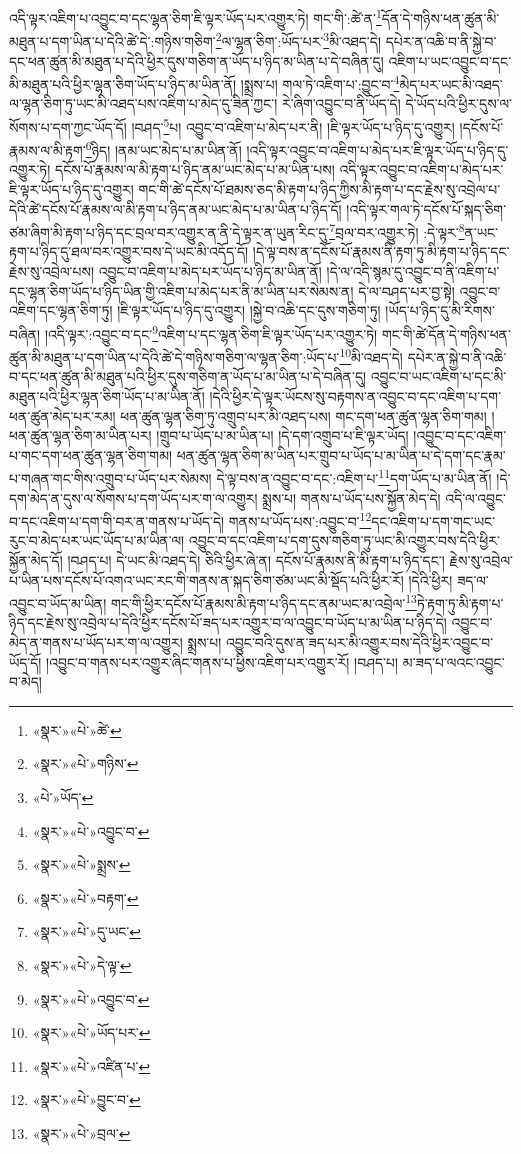 འདི་ལྟར་འཇིག་པ་འབྱུང་བ་དང་ལྷན་ཅིག་ཇི་ལྟར་ཡོད་པར་འགྱུར་ཏེ། གང་གི་:ཚེ་ན་\footnote{«སྣར་»«པེ་»ཚེ་}དོན་དེ་གཉིས་ཕན་ཚུན་མི་མཐུན་པ་དག་ཡིན་པ་དེའི་ཚེ་དེ་:གཉིས་གཅིག་\footnote{«སྣར་»«པེ་»གཉིས་}ལ་ལྷན་ཅིག་:ཡོད་པར་\footnote{«པེ་»ཡོད་}མི་འཐད་དེ། དཔེར་ན་འཆི་བ་ནི་སྐྱེ་བ་དང་ཕན་ཚུན་མི་མཐུན་པ་དེའི་ཕྱིར་དུས་གཅིག་ན་ཡོད་པ་ཉིད་མ་ཡིན་པ་དེ་བཞིན་དུ། འཇིག་པ་ཡང་འབྱུང་བ་དང་མི་མཐུན་པའི་ཕྱིར་ལྷན་ཅིག་ཡོད་པ་ཉིད་མ་ཡིན་ནོ། །སྨྲས་པ། གལ་ཏེ་འཇིག་པ་:བྱུང་བ་\footnote{«སྣར་»«པེ་»འབྱུང་བ་}མེད་པར་ཡང་མི་འཐད་ལ་ལྷན་ཅིག་ཏུ་ཡང་མི་འཐད་པས་འཇིག་པ་མེད་དུ་ཟིན་ཀྱང་། རེ་ཞིག་འབྱུང་བ་ནི་ཡོད་དེ། དེ་ཡོད་པའི་ཕྱིར་དུས་ལ་སོགས་པ་དག་ཀྱང་ཡོད་དོ། །བཤད་\footnote{«སྣར་»«པེ་»སྨྲས་}པ། འབྱུང་བ་འཇིག་པ་མེད་པར་ནི། །ཇི་ལྟར་ཡོད་པ་ཉིད་དུ་འགྱུར། །དངོས་པོ་རྣམས་ལ་མི་རྟག་\footnote{«སྣར་»«པེ་»བརྟག་}ཉིད། །ནམ་ཡང་མེད་པ་མ་ཡིན་ནོ། །འདི་ལྟར་འབྱུང་བ་འཇིག་པ་མེད་པར་ཇི་ལྟར་ཡོད་པ་ཉིད་དུ་འགྱུར་ཏེ། དངོས་པོ་རྣམས་ལ་མི་རྟག་པ་ཉིད་ནམ་ཡང་མེད་པ་མ་ཡིན་པས། འདི་ལྟར་འབྱུང་བ་འཇིག་པ་མེད་པར་ཇི་ལྟར་ཡོད་པ་ཉིད་དུ་འགྱུར། གང་གི་ཚེ་དངོས་པོ་ཐམས་ཅད་མི་རྟག་པ་ཉིད་ཀྱིས་མི་རྟག་པ་དང་རྗེས་སུ་འབྲེལ་པ་དེའི་ཚེ་དངོས་པོ་རྣམས་ལ་མི་རྟག་པ་ཉིད་ནམ་ཡང་མེད་པ་མ་ཡིན་པ་ཉིད་དོ། །འདི་ལྟར་གལ་ཏེ་དངོས་པོ་སྐད་ཅིག་ཙམ་ཞིག་མི་རྟག་པ་ཉིད་དང་བྲལ་བར་འགྱུར་ན་ནི་དེ་ལྟར་ན་ཡུན་རིང་དུ་\footnote{«སྣར་»«པེ་»དུ་ཡང་}བྲལ་བར་འགྱུར་ཏེ། :དེ་ལྟར་\footnote{«སྣར་»«པེ་»དེ་ལྟ་}ན་ཡང་རྟག་པ་ཉིད་དུ་ཐལ་བར་འགྱུར་བས་དེ་ཡང་མི་འདོད་དོ། །དེ་ལྟ་བས་ན་དངོས་པོ་རྣམས་ནི་རྟག་ཏུ་མི་རྟག་པ་ཉིད་དང་རྗེས་སུ་འབྲེལ་པས། འབྱུང་བ་འཇིག་པ་མེད་པར་ཡོད་པ་ཉིད་མ་ཡིན་ནོ། །དེ་ལ་འདི་སྙམ་དུ་འབྱུང་བ་ནི་འཇིག་པ་དང་ལྷན་ཅིག་ཡོད་པ་ཉིད་ཡིན་གྱི་འཇིག་པ་མེད་པར་ནི་མ་ཡིན་པར་སེམས་ན། དེ་ལ་བཤད་པར་བྱ་སྟེ། འབྱུང་བ་འཇིག་དང་ལྷན་ཅིག་ཏུ། །ཇི་ལྟར་ཡོད་པ་ཉིད་དུ་འགྱུར། །སྐྱེ་བ་འཆི་དང་དུས་གཅིག་ཏུ། །ཡོད་པ་ཉིད་དུ་མི་རིགས་བཞིན། །འདི་ལྟར་:འབྱུང་བ་དང་\footnote{«སྣར་»«པེ་»འབྱུང་བ་}འཇིག་པ་དང་ལྷན་ཅིག་ཇི་ལྟར་ཡོད་པར་འགྱུར་ཏེ། གང་གི་ཚེ་དོན་དེ་གཉིས་ཕན་ཚུན་མི་མཐུན་པ་དག་ཡིན་པ་དེའི་ཚེ་དེ་གཉིས་གཅིག་ལ་ལྷན་ཅིག་:ཡོད་པ་\footnote{«སྣར་»«པེ་»ཡོད་པར་}མི་འཐད་དེ། དཔེར་ན་སྐྱེ་བ་ནི་འཆི་བ་དང་ཕན་ཚུན་མི་མཐུན་པའི་ཕྱིར་དུས་གཅིག་ན་ཡོད་པ་མ་ཡིན་པ་དེ་བཞིན་དུ། འབྱུང་བ་ཡང་འཇིག་པ་དང་མི་མཐུན་པའི་ཕྱིར་ལྷན་ཅིག་ཡོད་པ་མ་ཡིན་ནོ། །དེའི་ཕྱིར་དེ་ལྟར་ཡོངས་སུ་བརྟགས་ན་འབྱུང་བ་དང་འཇིག་པ་དག་ཕན་ཚུན་མེད་པར་རམ། ཕན་ཚུན་ལྷན་ཅིག་ཏུ་འགྲུབ་པར་མི་འཐད་པས། གང་དག་ཕན་ཚུན་ལྷན་ཅིག་གམ། །ཕན་ཚུན་ལྷན་ཅིག་མ་ཡིན་པར། །གྲུབ་པ་ཡོད་པ་མ་ཡིན་པ། །དེ་དག་འགྲུབ་པ་ཇི་ལྟར་ཡོད། །འབྱུང་བ་དང་འཇིག་པ་གང་དག་ཕན་ཚུན་ལྷན་ཅིག་གམ། ཕན་ཚུན་ལྷན་ཅིག་མ་ཡིན་པར་གྲུབ་པ་ཡོད་པ་མ་ཡིན་པ་དེ་དག་དང་རྣམ་པ་གཞན་གང་གིས་འགྲུབ་པ་ཡོད་པར་སེམས། དེ་ལྟ་བས་ན་འབྱུང་བ་དང་:འཇིག་པ་\footnote{«སྣར་»«པེ་»འཛིན་པ་}དག་ཡོད་པ་མ་ཡིན་ནོ། །དེ་དག་མེད་ན་དུས་ལ་སོགས་པ་དག་ཡོད་པར་ག་ལ་འགྱུར། སྨྲས་པ། གནས་པ་ཡོད་པས་སྐྱོན་མེད་དེ། འདི་ལ་འབྱུང་བ་དང་འཇིག་པ་དག་གི་བར་ན་གནས་པ་ཡོད་དེ། གནས་པ་ཡོད་པས་:འབྱུང་བ་\footnote{«སྣར་»«པེ་»བྱུང་བ་}དང་འཇིག་པ་དག་གང་ཡང་རུང་བ་མེད་པར་ཡང་ཡོད་པ་མ་ཡིན་ལ། འབྱུང་བ་དང་འཇིག་པ་དག་དུས་གཅིག་ཏུ་ཡང་མི་འགྱུར་བས་དེའི་ཕྱིར་སྐྱོན་མེད་དོ། །བཤད་པ། དེ་ཡང་མི་འཐད་དེ། ཅིའི་ཕྱིར་ཞེ་ན། དངོས་པོ་རྣམས་ནི་མི་རྟག་པ་ཉིད་དང་། རྗེས་སུ་འབྲེལ་པ་ཡིན་པས་དངོས་པོ་འགའ་ཡང་རང་གི་གནས་ན་སྐད་ཅིག་ཙམ་ཡང་མི་སྡོད་པའི་ཕྱིར་རོ། །དེའི་ཕྱིར། ཟད་ལ་འབྱུང་བ་ཡོད་མ་ཡིན། གང་གི་ཕྱིར་དངོས་པོ་རྣམས་མི་རྟག་པ་ཉིད་དང་ནམ་ཡང་མ་འབྲེལ་\footnote{«སྣར་»«པེ་»བྲལ་}ཏེ་རྟག་ཏུ་མི་རྟག་པ་ཉིད་དང་རྗེས་སུ་འབྲེལ་པ་དེའི་ཕྱིར་དངོས་པོ་ཟད་པར་འགྱུར་བ་ལ་འབྱུང་བ་ཡོད་པ་མ་ཡིན་པ་ཉིད་དེ། འབྱུང་བ་མེད་ན་གནས་པ་ཡོད་པར་ག་ལ་འགྱུར། སྨྲས་པ། འབྱུང་བའི་དུས་ན་ཟད་པར་མི་འགྱུར་བས་དེའི་ཕྱིར་འབྱུང་བ་ཡོད་དོ། །འབྱུང་བ་གནས་པར་འགྱུར་ཞིང་གནས་པ་ཕྱིས་འཇིག་པར་འགྱུར་རོ། །བཤད་པ། མ་ཟད་པ་ལའང་འབྱུང་བ་མེད། 